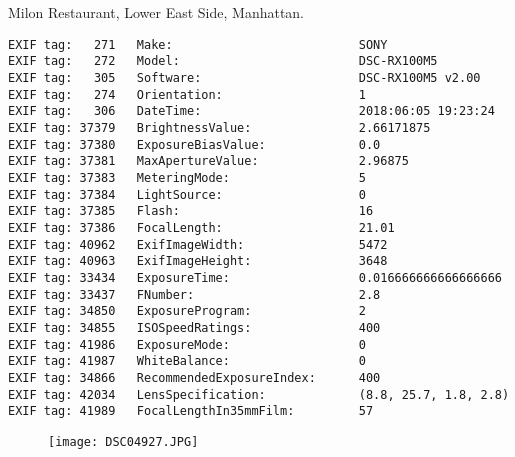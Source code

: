 \section{\protect{}}
\noindent Milon Restaurant, Lower East Side, Manhattan.
\noindent
\begin{lstlisting}
EXIF tag:   271   Make:                          SONY
EXIF tag:   272   Model:                         DSC-RX100M5
EXIF tag:   305   Software:                      DSC-RX100M5 v2.00
EXIF tag:   274   Orientation:                   1
EXIF tag:   306   DateTime:                      2018:06:05 19:23:24
EXIF tag: 37379   BrightnessValue:               2.66171875
EXIF tag: 37380   ExposureBiasValue:             0.0
EXIF tag: 37381   MaxApertureValue:              2.96875
EXIF tag: 37383   MeteringMode:                  5
EXIF tag: 37384   LightSource:                   0
EXIF tag: 37385   Flash:                         16
EXIF tag: 37386   FocalLength:                   21.01
EXIF tag: 40962   ExifImageWidth:                5472
EXIF tag: 40963   ExifImageHeight:               3648
EXIF tag: 33434   ExposureTime:                  0.016666666666666666
EXIF tag: 33437   FNumber:                       2.8
EXIF tag: 34850   ExposureProgram:               2
EXIF tag: 34855   ISOSpeedRatings:               400
EXIF tag: 41986   ExposureMode:                  0
EXIF tag: 41987   WhiteBalance:                  0
EXIF tag: 34866   RecommendedExposureIndex:      400
EXIF tag: 42034   LensSpecification:             (8.8, 25.7, 1.8, 2.8)
EXIF tag: 41989   FocalLengthIn35mmFilm:         57

\end{lstlisting}
\clearpage
\begin{figure}
\raggedleft
\texttt{[image: DSC04927.JPG]}
\end{figure}


\clearpage
